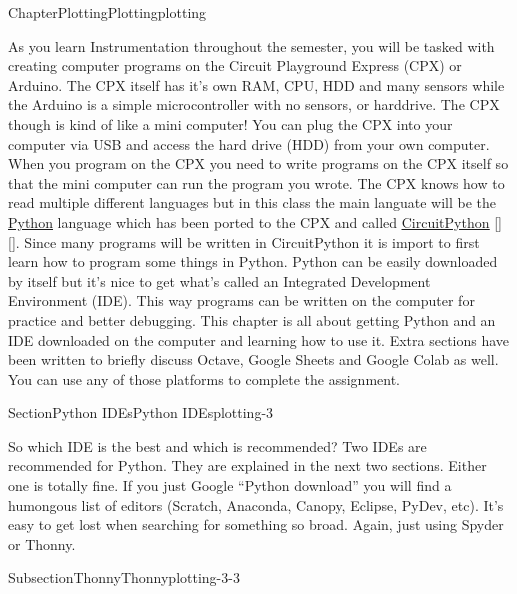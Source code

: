\documentclass[oneside,10pt,]{book}
\newcommand{\xreffont}{\relax}
\newcommand{\linkhilite}[1]{\underline{#1}}
\numberwithin{equation}{section}
\begin{document}
\begin{chapterptx}{Chapter}{Plotting}{}{Plotting}{}{}{plotting}
\begin{introduction}{}
As you learn Instrumentation throughout the semester, you will be tasked with creating computer programs on the Circuit Playground Express (CPX) or Arduino. The CPX itself has it's own RAM, CPU, HDD and many sensors while the Arduino is a simple microcontroller with no sensors, or harddrive. The CPX though is kind of like a mini computer! You can plug the CPX into your computer via USB and access the hard drive (HDD) from your own computer. When you program on the CPX you need to write programs on the CPX itself so that the mini computer can run the program you wrote. The CPX knows how to read multiple different languages but in this class the main languate will be the \href{https://www.python.org/}{\linkhilite{Python}} language which has been ported to the CPX and called \href{https://circuitpython.org/}{\linkhilite{CircuitPython}} \hyperlink{python}{\linkhilite{[{\xreffont 51}]}}\hyperlink{CircuitPython}{\linkhilite{[{\xreffont 30}]}}. Since many programs will be written in CircuitPython it is import to first learn how to program some things in Python. Python can be easily downloaded by itself but it's nice to get what's called an Integrated Development Environment (IDE). This way programs can be written on the computer for practice and better debugging. This chapter is all about getting Python and an IDE downloaded on the computer and learning how to use it. Extra sections have been written to briefly discuss Octave, Google Sheets and Google Colab as well. You can use any of those platforms to complete the assignment.%
\end{introduction}%
%
%
\typeout{************************************************}
\typeout{************************************************}
%
\begin{sectionptx}{Section}{Python IDEs}{}{Python IDEs}{}{}{plotting-3}
\begin{introduction}{}%
So which IDE is the best and which is recommended? Two IDEs are recommended for Python. They are explained in the next two sections. Either one is totally fine. If you just Google \textquotedblleft{}Python download\textquotedblright{} you will find a humongous list of editors (Scratch, Anaconda, Canopy, Eclipse, PyDev, etc). It's easy to get lost when searching for something so broad. Again, just using Spyder or Thonny.%
\end{introduction}%
%
%
\typeout{************************************************}
\typeout{************************************************}
%
\begin{subsectionptx}{Subsection}{Thonny}{}{Thonny}{}{}{plotting-3-3}

\end{subsectionptx}
\end{sectionptx}
\end{chapterptx}
\end{document}
